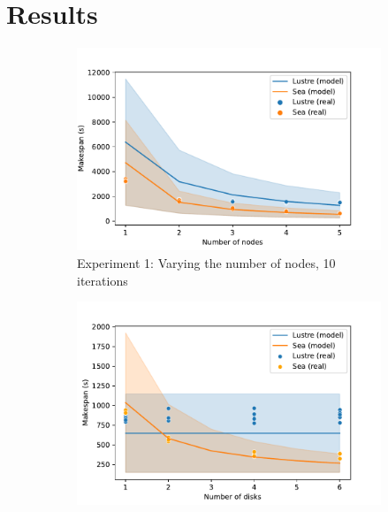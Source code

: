 \documentclass[10pt,journal,compsoc]{IEEEtran}
\begin{document}
\section{Results}

    \begin{figure}

    \begin{subfigure}{\columnwidth}
        \centering
        \captionsetup{width=.85\linewidth}
        \includegraphics[width=\columnwidth]{figures/nodes.pdf}%
        \caption{Experiment 1: Varying the number of nodes, 10
        iterations}\label{fig:sea-comp:nodes}
    \end{subfigure}
    \begin{subfigure}{\columnwidth}
        \centering
        \captionsetup{width=.85\linewidth}
        \includegraphics[width=\linewidth]{figures/disks.pdf}

\end{subfigure}
\end{figure}
\end{document}
